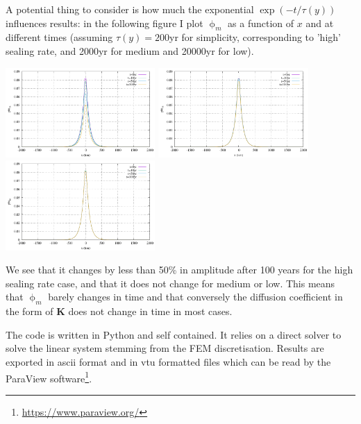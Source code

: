 A potential thing to consider is how much the exponential $\exp(-t/\tau(y))$
influences results: in the following figure I plot $\upphi_m$ as a function of 
$x$ and at different times (assuming $\tau(y)=200$yr for simplicity, corresponding
to 'high' sealing rate, and 2000yr for medium and 20000yr for low).

\begin{center}
\includegraphics[width=5.7cm]{python_codes/fieldstone_126/images/phi200}
\includegraphics[width=5.7cm]{python_codes/fieldstone_126/images/phi2000}
\includegraphics[width=5.7cm]{python_codes/fieldstone_126/images/phi20000}
\end{center}

We see that it changes by less than 50\% in amplitude after 100 years for the 
high sealing rate case, and that it does not change for medium or low.  
This means that $\upphi_m$ barely changes in time and that 
conversely the diffusion coefficient in the form of ${\bm K}$ does not
change in time in most cases. 

The code is written in Python and self contained. It relies on a direct solver
to solve the linear system stemming from the FEM discretisation.
Results are exported in ascii format and in vtu formatted files which can be read by the 
ParaView software\footnote{\url{https://www.paraview.org/}}.


\newpage

